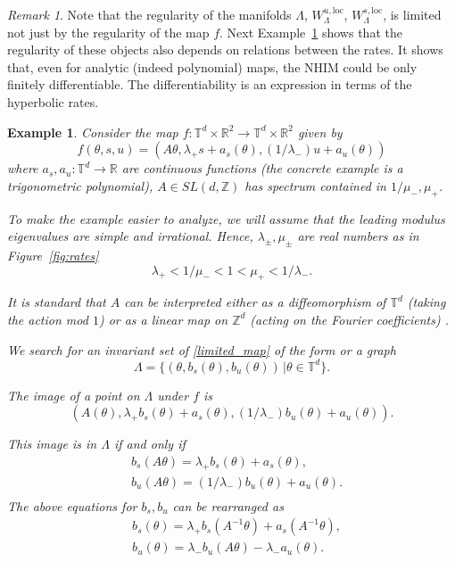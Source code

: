\documentclass[11pt]{amsart}
\newtheorem{ex}[thm]{Example}
\theoremstyle{definition}
\theoremstyle{remark}
\newtheorem{rem}[thm]{Remark}
\numberwithin{equation}{section}
\newcommand{\Z}{\mathbb Z}
\def\integer{{\mathbb Z}}
\def\torus{{\mathbb T}}
\def\real{{\mathbb R}}
\begin{document}
\begin{rem}
Note that the regularity of the manifolds $\Lambda$, $W^{u,\mathrm{loc}}_\Lambda$, $W^{s,\mathrm{loc}}_\Lambda$, is limited not just   by the regularity of the map $f$.
Next Example~\ref{regularitylimited} shows that the regularity of these objects also depends on relations between the rates.
It  shows that, even for analytic (indeed polynomial)
maps, the NHIM could be only finitely differentiable.
The differentiability is an expression in terms of the
hyperbolic rates.
\end{rem}


\begin{ex}\label{regularitylimited}
  Consider the map $f: \torus^d \times \real^2 \rightarrow  \torus^d \times \real^2$
  given by
  \begin{equation} \label{limited_map}
  f(\theta, s, u ) =
  (A \theta, \lambda_+s + a_s(\theta), (1 /\lambda_-)  u  + a_u(\theta))
  \end{equation}
  where
  $a_s, a_u: \torus^d \rightarrow \real$ are continuous functions
  (the concrete example is a trigonometric polynomial),
  $A \in SL(d, \Z)$ has spectrum contained in $1/\mu_-, \mu_+$.

  To make the example easier to analyze, we will assume that
  the leading modulus eigenvalues are simple and irrational.
  Hence,  $\lambda_\pm, \mu_\pm$ are real  numbers
    as in Figure~\ref{fig:rates}
  \[
  \lambda_+ < 1/\mu_- <  1 < \mu_+ <  1/\lambda_- .
  \]

  It is standard  that $A$ can be interpreted either as a diffeomorphism
  of $\torus^d$ (taking the action mod $1$)
  or as a linear  map  on $\integer^d
  $ (acting on the Fourier
  coefficients) \cite{KatokH95}.

  We search for an invariant set  of \eqref{limited_map}
of   the form or a graph
  \[
  \Lambda = \{ (\theta, b_s (\theta), b_u (\theta)) \,  | \theta \in \torus^d\} .
  \]

  The image of a point on $\Lambda$  under $f$ is
  \[
  ( A(\theta), \lambda_+  b_s (\theta) + a_s(\theta),
  (1/\lambda_-)   b_u(\theta) + a_u(\theta) ) .
  \]

  This image is in $\Lambda$  if
  and only if
  \[
  \begin{split}
    &  b_s(A\theta) =   \lambda_+  b_s (\theta) + a_s(\theta) ,\\
    &  b_u(A\theta) =   (1/\lambda_-)  b_u (\theta) + a_u(\theta) . \\
  \end{split}
  \]
  The above equations for $b_s, b_u$ can be rearranged as
  \begin{equation} \label{fixed_point}
  \begin{split}
    &  b_s(\theta) =   \lambda_+  b_s (A^{-1} \theta) + a_s(A^{-1} \theta) , \\
    &  b_u (\theta)  =  \lambda_- b_u(A\theta)  - \lambda_- a_u(\theta) . \\
  \end{split}
  \end{equation}



\end{ex}
\end{document}
